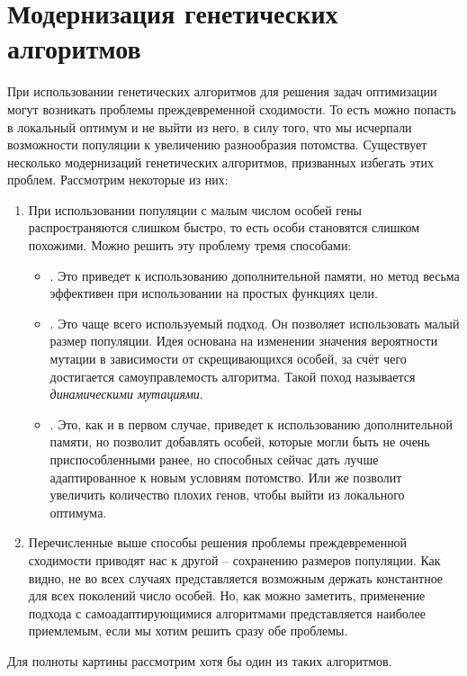 \chapter{Модернизация генетических алгоритмов}

При использовании генетических алгоритмов для решения задач оптимизации могут возникать проблемы преждевременной сходимости. То есть можно попасть в локальный оптимум и не выйти из него, в силу того, что мы исчерпали возможности популяции к увеличению разнообразия потомства. Существует несколько модернизаций генетических алгоритмов, призванных избегать этих проблем. Рассмотрим некоторые из них:

\begin{enumerate}
\item При использовании популяции с малым числом особей гены распространяются слишком быстро, то есть особи становятся слишком похожими. Можно решить эту проблему тремя способами:
	 \begin{itemize}[label=$\ast$]
	\item {}. Это приведет к использованию дополнительной памяти, но метод весьма эффективен при использовании на простых функциях цели.
	\item {}. Это чаще всего используемый подход. Он позволяет использовать малый размер популяции. Идея основана на изменении значения вероятности мутации в зависимости от скрещивающихся особей, за счёт чего достигается самоуправлемость алгоритма. Такой поход называется \textit{динамическими мутациями}.
	 \item {}. Это, как и в первом случае, приведет к использованию дополнительной памяти, но позволит добавлять особей, которые могли быть не очень приспособленными ранее, но способных сейчас дать лучше адаптированное к новым условиям потомство. Или же позволит увеличить количество плохих генов, чтобы выйти из локального оптимума. 
	\end{itemize}
\item Перечисленные выше способы решения проблемы преждевременной сходимости приводят нас к другой -- сохранению размеров популяции. Как видно, не во всех случаях представляется возможным держать константное для всех поколений число особей. Но, как можно заметить, применение подхода с самоадаптирующимися алгоритмами представляется наиболее приемлемым, если мы хотим решить сразу обе проблемы. 
\end{enumerate}
Для полноты картины рассмотрим хотя бы один из таких алгоритмов.
\pagebreak

